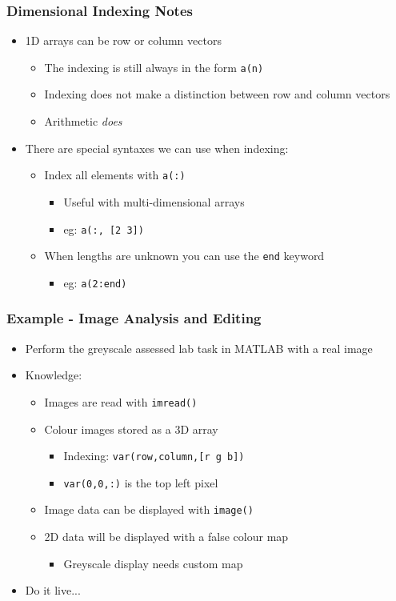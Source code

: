 \documentclass[14pt]{beamer}
\begin{document}
\begin{frame}
\frametitle{Dimensional Indexing Notes}
\begin{itemize}
\item 1D arrays can be row or column vectors
	\begin{itemize}
		\item The indexing is still always in the form \texttt{a(n)}
		\item Indexing does not make a distinction between row and column vectors
		\item Arithmetic \textit{does}
	\end{itemize}
\pause
\item There are special syntaxes we can use when indexing:
	\begin{itemize}
		\item Index all elements with \texttt{a(:)}
			\begin{itemize}
				\item Useful with multi-dimensional arrays
				\item eg: \texttt{a(:, [2 3])}
			\end{itemize}
		\item When lengths are unknown you can use the \texttt{end} keyword
			\begin{itemize}
				\item eg: \texttt{a(2:end)}
			\end{itemize}
	\end{itemize}
\end{itemize}
\end{frame}

\begin{frame}
\frametitle{Example - Image Analysis and Editing}
\begin{itemize}
\item Perform the greyscale assessed lab task in MATLAB with a real image
\item Knowledge:
	\begin{itemize}
		\item Images are read with \texttt{imread()}
		\item Colour images stored as a 3D array
			\begin{itemize}
				\item Indexing: \texttt{var(row,column,[r g b])}
				\item \texttt{var(0,0,:)} is the top left pixel
			\end{itemize}
		\item Image data can be displayed with \texttt{image()}
		\item 2D data will be displayed with a false colour map
			\begin{itemize}
				\item Greyscale display needs custom map
			\end{itemize}
	\end{itemize}
\item Do it live...
\end{itemize}
\end{frame}
\end{document}
